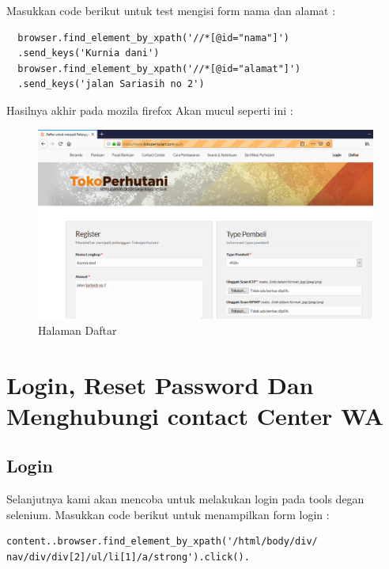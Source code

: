 Masukkan code berikut untuk test mengisi form nama dan alamat :
\begin{verbatim}
  browser.find_element_by_xpath('//*[@id="nama"]')
  .send_keys('Kurnia dani')
  browser.find_element_by_xpath('//*[@id="alamat"]')
  .send_keys('jalan Sariasih no 2')
\end{verbatim}

Hasilnya akhir pada mozila firefox Akan mucul seperti ini :
\begin{figure}[h]
	\centering
	\includegraphics[scale=0.24]{figures/4daftar}
	\caption{Halaman Daftar}
\end{figure}


















\newpage
\section{Login, Reset Password Dan Menghubungi contact Center WA}
\subsection{Login}
Selanjutnya kami akan mencoba untuk melakukan login pada tools degan selenium. 
Masukkan code berikut untuk menampilkan form login :
\begin{verbatim}
content..browser.find_element_by_xpath('/html/body/div/
nav/div/div[2]/ul/li[1]/a/strong').click().
\end{verbatim}



